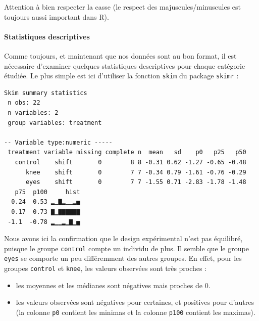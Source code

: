 \documentclass[a4paperpaper,]{article}
\newenvironment{Shaded}{\begin{snugshade}}{\end{snugshade}}
\newcommand{\KeywordTok}[1]{\textcolor[rgb]{0.12,0.11,0.11}{\textbf{#1}}}
\newcommand{\NormalTok}[1]{\textcolor[rgb]{0.12,0.11,0.11}{#1}}
\newcommand{\OperatorTok}[1]{\textcolor[rgb]{0.12,0.11,0.11}{#1}}
\newcommand{\StringTok}[1]{\textcolor[rgb]{0.75,0.01,0.01}{#1}}
\providecommand{\tightlist}{%
  \setlength{\itemsep}{0pt}\setlength{\parskip}{0pt}}
\let\oldparagraph\paragraph
\renewcommand{\paragraph}[1]{\oldparagraph{#1}\mbox{}}
\begin{document}
Attention à bien respecter la casse (le respect des majuscules/minuscules est toujours aussi important dans R).

\hypertarget{statistiques-descriptives-3}{%
\paragraph{Statistiques descriptives}\label{statistiques-descriptives-3}}

Comme toujours, et maintenant que nos données sont au bon format, il est nécessaire d'examiner quelques statistiques descriptives pour chaque catégorie étudiée. Le plus simple est ici d'utiliser la fonction \texttt{skim} du package \texttt{skimr} :

\begin{Shaded}
\end{Shaded}

\begin{verbatim}
Skim summary statistics
 n obs: 22 
 n variables: 2 
 group variables: treatment 

-- Variable type:numeric -----
 treatment variable missing complete n  mean   sd    p0   p25   p50
   control    shift       0        8 8 -0.31 0.62 -1.27 -0.65 -0.48
      knee    shift       0        7 7 -0.34 0.79 -1.61 -0.76 -0.29
      eyes    shift       0        7 7 -1.55 0.71 -2.83 -1.78 -1.48
   p75  p100     hist
  0.24  0.53 ▂▁▇▂▁▁▂▅
  0.17  0.73 ▇▁▇▇▇▇▇▇
 -1.1  -0.78 ▂▁▁▂▁▇▁▅
\end{verbatim}

Nous avons ici la confirmation que le design expérimental n'est pas équilibré, puisque le groupe \texttt{control} compte un individu de plus. Il semble que le groupe \texttt{eyes} se comporte un peu différemment des autres groupes. En effet, pour les groupes \texttt{control} et \texttt{knee}, les valeurs observées sont très proches :

\begin{itemize}
\tightlist
\item
  les moyennes et les médianes sont négatives mais proches de 0.
\item
  les valeurs observées sont négatives pour certaines, et positives pour d'autres (la colonne \texttt{p0} contient les minimas et la colonne \texttt{p100} contient les maximas).
\end{itemize}
\end{document}
